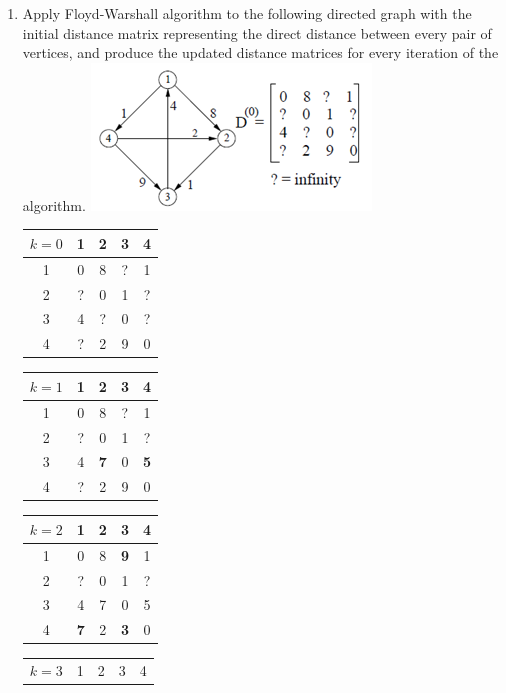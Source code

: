 \documentclass{article}
\begin{document}
\begin{enumerate}
    \item Apply Floyd-Warshall algorithm to the following directed graph with 
    the initial distance matrix representing the direct distance between every 
    pair of vertices, and produce the updated distance matrices for every 
    iteration of the algorithm. \newline
    \includegraphics[scale=0.75]{p7_graph}\newline
    \begin{tabular}{|c|c|c|c|c|}
    \hline
    $k=0$ & 1 & 2 & 3 & 4 \\
    \hline
    1 & 0 & 8 & ? & 1 \\
    \hline
    2 & ? & 0 & 1 & ? \\
    \hline
    3 & 4 & ? & 0 & ? \\
    \hline
    4 & ? & 2 & 9 & 0 \\
    \hline
    \end{tabular}
    \quad
    \begin{tabular}{|c|c|c|c|c|}
    \hline
    $k=1$ & 1 & 2 & 3 & 4 \\
    \hline
    1 & 0 & 8 & ? & 1 \\
    \hline
    2 & ? & 0 & 1 & ? \\
    \hline
    3 & 4 & \textbf{7} & 0 & \textbf{5} \\
    \hline
    4 & ? & 2 & 9 & 0 \\
    \hline
    \end{tabular}
    \quad
    \begin{tabular}{|c|c|c|c|c|}
    \hline
    $k=2$ & 1 & 2 & 3 & 4 \\
    \hline
    1 & 0 & 8 & \textbf{9} & 1 \\
    \hline
    2 & ? & 0 & 1 & ? \\
    \hline
    3 & 4 & 7 & 0 & 5 \\
    \hline
    4 & \textbf{7} & 2 & \textbf{3} & 0 \\
    \hline
    \end{tabular}
    \quad
    \begin{tabular}{|c|c|c|c|c|}
    \hline
    $k=3$ & 1 & 2 & 3 & 4 \\

\end{tabular}
\end{enumerate}
\end{document}
